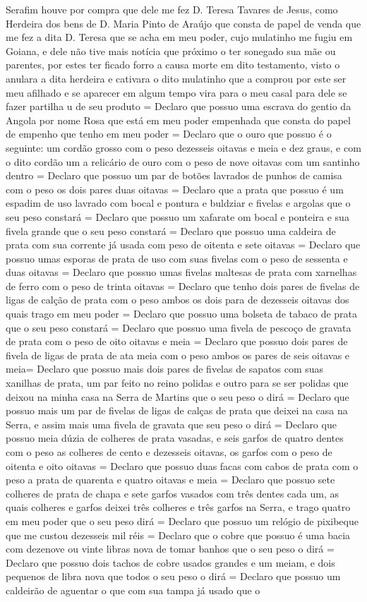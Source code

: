 \begin{refsection}
Serafim houve por compra que dele me fez D. Teresa Tavares de Jesus, como Herdeira dos bens de D. Maria Pinto de Araújo que consta de papel de venda que me fez a dita D. Teresa que se acha em meu poder, cujo mulatinho me fugiu em Goiana, e dele não tive mais notícia que próximo o ter sonegado sua mãe ou parentes, por estes ter ficado forro a causa morte em dito testamento, visto o anulara a dita herdeira e cativara o dito mulatinho que a comprou por este ser meu afilhado e se aparecer em algum tempo vira para o meu casal para dele se fazer partilha u de seu produto = Declaro que possuo uma escrava do gentio da Angola por nome Rosa que está em meu poder empenhada que consta do papel de empenho que tenho em meu poder  = Declaro que o ouro que possuo é o seguinte: um cordão grosso com o peso dezesseis oitavas e meia e dez graus, e com o dito cordão um a relicário de ouro com o peso de nove oitavas com um santinho dentro = Declaro que possuo um par de botões lavrados de punhos de camisa com o peso os dois pares duas oitavas  = Declaro que a prata que possuo é um espadim de uso lavrado com bocal e pontura  e buldziar e fivelas e argolas que o seu peso constará = Declaro que possuo um xafarate om bocal e ponteira e sua fivela grande que o seu peso constará = Declaro que possuo uma caldeira de prata com sua corrente já usada com peso de oitenta e sete oitavas = Declaro que possuo umas esporas de prata de uso com suas fivelas com o peso de sessenta e duas oitavas = Declaro que possuo umas fivelas maltesas de prata com xarnelhas de ferro com o peso de trinta oitavas = Declaro que tenho dois pares de fivelas de ligas de calção de prata com o peso ambos os dois para de dezesseis oitavas dos quais trago em meu poder = Declaro que possuo uma bolseta de tabaco de prata que o seu peso constará = Declaro que possuo uma fivela de pescoço de gravata de prata com o peso de oito oitavas e meia = Declaro que possuo dois pares de fivela de ligas de prata de ata meia com o peso ambos os pares de seis oitavas e meia= Declaro que possuo mais dois pares de fivelas de sapatos com suas xanilhas de prata, um par feito no reino polidas e outro para se ser polidas que deixou na minha casa na Serra de Martins que o seu peso o dirá = Declaro que possuo mais um par de fivelas de ligas de calças de prata que deixei na casa na Serra, e assim mais uma fivela de gravata que seu peso o dirá = Declaro que possuo meia dúzia de colheres de prata vasadas, e seis garfos de quatro dentes com o peso as colheres de cento e dezesseis oitavas, os garfos com o peso de oitenta e oito oitavas = Declaro que possuo duas facas com cabos de prata com o peso a prata de quarenta e quatro oitavas e meia = Declaro que possuo sete colheres de prata de chapa e sete garfos vasados com três dentes cada um, as quais colheres e garfos deixei três colheres e três garfos na Serra, e trago quatro em meu poder que o seu peso dirá = Declaro que possuo um relógio de pixibeque que me custou dezesseis mil réis = Declaro que o cobre que possuo é uma bacia com dezenove ou vinte libras nova de tomar banhos que o seu peso o dirá = Declaro que possuo dois tachos de cobre usados grandes e um meiam, e dois pequenos de libra nova que todos o seu peso o dirá = Declaro que possuo um caldeirão de aguentar o que com sua tampa já usado que o 
\end{refsection}
